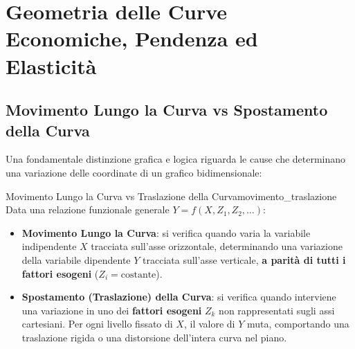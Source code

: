 \section{Geometria delle Curve Economiche, Pendenza ed Elasticità}

\subsection{Movimento Lungo la Curva vs Spostamento della Curva}
Una fondamentale distinzione grafica e logica riguarda le cause che determinano una variazione delle coordinate di un grafico bidimensionale:

\begin{definizione}{Movimento Lungo la Curva vs Traslazione della Curva}{movimento_traslazione}
Data una relazione funzionale generale $Y = f(X, Z_1, Z_2, \dots)$:
\begin{itemize}
    \item \textbf{Movimento Lungo la Curva}: si verifica quando varia la variabile indipendente $X$ tracciata sull'asse orizzontale, determinando una variazione della variabile dipendente $Y$ tracciata sull'asse verticale, \textbf{a parità di tutti i fattori esogeni} ($Z_i = \text{costante}$).
    \item \textbf{Spostamento (Traslazione) della Curva}: si verifica quando interviene una variazione in uno dei \textbf{fattori esogeni} $Z_k$ non rappresentati sugli assi cartesiani. Per ogni livello fissato di $X$, il valore di $Y$ muta, comportando una traslazione rigida o una distorsione dell'intera curva nel piano.
\end{itemize}
\end{definizione}

